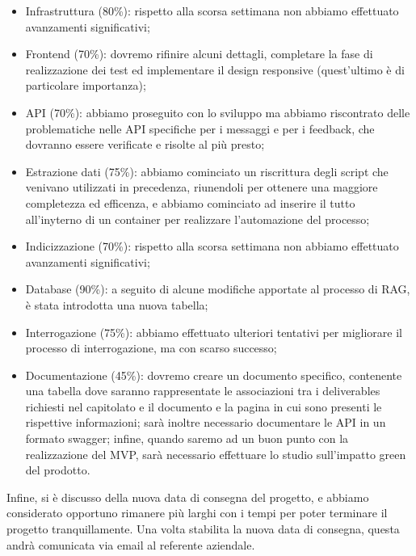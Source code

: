 \begin{itemize} 
    \item Infrastruttura (80\%): rispetto alla scorsa settimana non abbiamo effettuato avanzamenti significativi;
    \item Frontend (70\%): dovremo rifinire alcuni dettagli, completare la fase di realizzazione dei test ed implementare il design responsive (quest'ultimo è di particolare importanza);
    \item API (70\%): abbiamo proseguito con lo sviluppo ma abbiamo riscontrato delle problematiche nelle API specifiche per i messaggi e per i feedback, che dovranno essere verificate e risolte al più presto;
    \item Estrazione dati (75\%): abbiamo cominciato un riscrittura degli script che venivano utilizzati in precedenza, riunendoli per ottenere una maggiore completezza ed efficenza, e abbiamo cominciato ad inserire il tutto all'inyterno di un container per realizzare l'automazione del processo;
    \item Indicizzazione (70\%): rispetto alla scorsa settimana non abbiamo effettuato avanzamenti significativi;
    \item Database (90\%): a seguito di alcune modifiche apportate al processo di RAG, è stata introdotta una nuova tabella;
    \item Interrogazione (75\%): abbiamo effettuato ulteriori tentativi per migliorare il processo di interrogazione, ma con scarso successo;
    \item Documentazione (45\%): dovremo creare un documento specifico, contenente una tabella dove saranno rappresentate le associazioni tra i deliverables richiesti nel capitolato e il documento e la pagina in cui sono presenti le rispettive informazioni; sarà inoltre necessario documentare le API in un formato swagger; infine, quando saremo ad un buon punto con la realizzazione del MVP, sarà necessario effettuare lo studio sull'impatto green del prodotto.
\end{itemize}
Infine, si è discusso della nuova data di consegna del progetto, e abbiamo considerato opportuno rimanere più larghi con i tempi per poter terminare il progetto tranquillamente. Una volta stabilita la nuova data di consegna, questa andrà comunicata via email al referente aziendale.